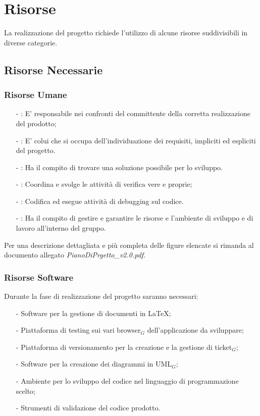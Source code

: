 \section{Risorse}
La realizzazione del progetto richiede l'utilizzo di alcune risorse suddivisibili in diverse categorie.
\subsection{Risorse Necessarie} 
\subsubsection{Risorse Umane}
\begin{itemize}
	\item[-] \textbf{\ruoloResponsabile}: E' responsabile nei confronti del committente della corretta realizzazione del prodotto;
	\item[-] \textbf{\ruoloAnalista}: E' colui che si occupa dell'individuazione dei requisiti, impliciti ed espliciti del progetto.
	\item[-] \textbf{\ruoloProgettista}: Ha il compito di trovare una soluzione possibile per lo sviluppo.
	\item[-] \textbf{\ruoloVerificatore}: Coordina e svolge le attività di verifica vere e proprie;
	\item[-] \textbf{\ruoloProgrammatore}: Codifica ed esegue attività di debugging sul codice.
	\item[-] \textbf{\ruoloAmministratore}: Ha il compito di gestire e garantire le risorse e l'ambiente di sviluppo e di lavoro all'interno del gruppo.
\end{itemize}
Per una descrizione dettagliata e più completa delle figure elencate si rimanda al documento allegato \textit{PianoDiPrgetto\_v2.0.pdf}.

\subsubsection{Risorse Software}
Durante la fase di realizzazione del progetto saranno necessari:
\begin{itemize}
	\item[-] Software per la gestione di documenti in \LaTeX;
	\item[-] Piattaforma di testing sui vari browser$_G$ dell'applicazione da sviluppare;
	\item[-] Piattaforma di versionamento per la creazione e la gestione di ticket$_G$;
	\item[-] Software per la creazione dei diagrammi in UML$_G$;
	\item[-] Ambiente per lo sviluppo del codice nel linguaggio di programmazione scelto;
	\item[-] Strumenti di validazione del codice prodotto.
\end{itemize}

